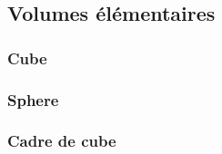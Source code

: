 \subsection{Volumes élémentaires}
\subsubsection{Cube}
\subsubsection{Sphere}
\subsubsection{Cadre de cube}